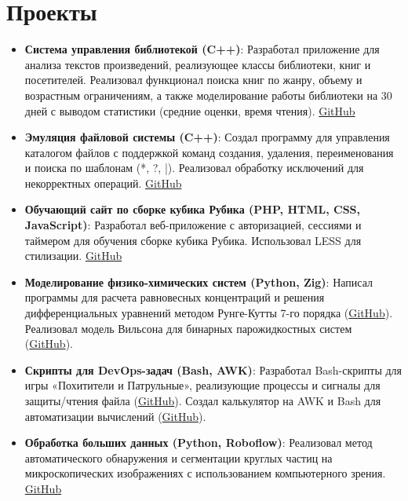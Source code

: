 \documentclass[a4paper,11pt]{article}
\begin{document}
	\section{Проекты}
	\begin{itemize}[leftmargin=*]
		\item \textbf{Система управления библиотекой (C++)}: Разработал приложение для анализа текстов произведений, реализующее классы библиотеки, книг и посетителей. Реализовал функционал поиска книг по жанру, объему и возрастным ограничениям, а также моделирование работы библиотеки на 30 дней с выводом статистики (средние оценки, время чтения). \href{https://github.com/CorgiPuppy/cpp-labs/tree/master/lab8}{GitHub}
		\item \textbf{Эмуляция файловой системы (C++)}: Создал программу для управления каталогом файлов с поддержкой команд создания, удаления, переименования и поиска по шаблонам (*, ?, |). Реализовал обработку исключений для некорректных операций. \href{https://github.com/CorgiPuppy/cpp-labs/tree/master/lab10}{GitHub}
		\item \textbf{Обучающий сайт по сборке кубика Рубика (PHP, HTML, CSS, JavaScript)}: Разработал веб-приложение с авторизацией, сессиями и таймером для обучения сборке кубика Рубика. Использовал LESS для стилизации. \href{https://github.com/CorgiPuppy/web-labs/tree/master/myOwnSite}{GitHub}
		\item \textbf{Моделирование физико-химических систем (Python, Zig)}: Написал программы для расчета равновесных концентраций и решения дифференциальных уравнений методом Рунге-Кутты 7-го порядка (\href{https://github.com/CorgiPuppy/phys-chem-labs/tree/master/lab7}{GitHub}). Реализовал модель Вильсона для бинарных парожидкостных систем (\href{https://github.com/CorgiPuppy/phys-chem-labs/tree/master/lab3}{GitHub}).
		\item \textbf{Скрипты для DevOps-задач (Bash, AWK)}: Разработал Bash-скрипты для игры «Похитители и Патрульные», реализующие процессы и сигналы для защиты/чтения файла (\href{https://github.com/CorgiPuppy/info-sys-admin-labs/tree/master/lab8}{GitHub}). Создал калькулятор на AWK и Bash для автоматизации вычислений (\href{https://github.com/CorgiPuppy/info-sys-admin-labs/tree/master/lab7/src/task3}{GitHub}).
		\item \textbf{Обработка больших данных (Python, Roboflow)}: Реализовал метод автоматического обнаружения и сегментации круглых частиц на микроскопических изображениях с использованием компьютерного зрения. \href{https://github.com/CorgiPuppy/big-data-labs/tree/master/labParticles}{GitHub}
	\end{itemize}
\end{document}
